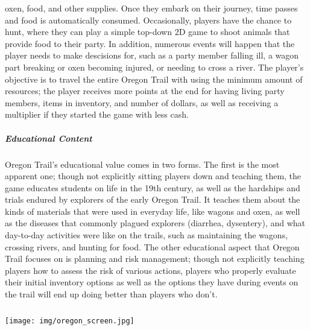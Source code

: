 oxen, food, and other supplies. Once they embark on their journey, time passes and food is automatically consumed. Occasionally, players have the chance to hunt, where they can play a simple top-down 2D game to shoot animals that provide food to their party. In addition, numerous events will happen that the player needs to make descisions for, such as a party member falling ill, a wagon part breaking or oxen becoming injured, or needing to cross a river. The player's objective is to travel the entire Oregon Trail with using the minimum amount of resources; the player receives more points at the end for having living party members, items in inventory, and number of dollars, as well as receiving a multiplier if they started the game with less cash.\subparagraph{Educational Content}Oregon Trail's educational value comes in two forms. The first is the most apparent one; though not explicitly sitting players down and teaching them, the game educates students on life in the 19th century, as well as the hardships and trials endured by explorers of the early Oregon Trail. It teaches them about the kinds of materials that were used in everyday life, like wagons and oxen, as well as the diseases that commonly plagued explorers (diarrhea, dysentery), and what day-to-day activities were like on the trails, such as maintaining the wagons, crossing rivers, and hunting for food. The other educational aspect that Oregon Trail focuses on is planning and risk management; though not explicitly teaching players how to assess the risk of various actions, players who properly evaluate their initial inventory options as well as the options they have during events on the trail will end up doing better than players who don't.\subparagraph{}\texttt{[image: img/oregon\_screen.jpg]}